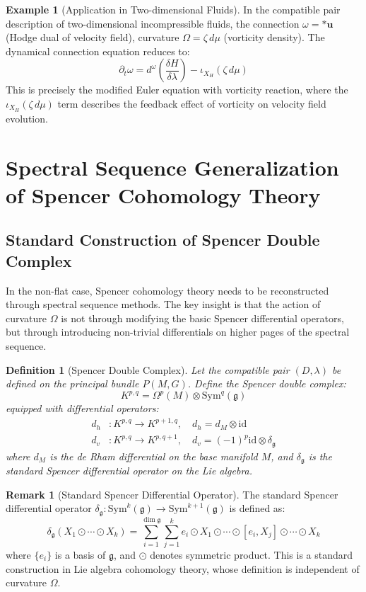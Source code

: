 \documentclass[a4paper,12pt]{extarticle}
\newtheorem{definition}{Definition}
\theoremstyle{definition}
\newtheorem{example}{Example}
\newtheorem{remark}{Remark}
\begin{document}
\begin{example}[Application in Two-dimensional Fluids]
In the compatible pair description of two-dimensional incompressible fluids\cite{zheng2025dynamical}, the connection $\omega = *\mathbf{u}$ (Hodge dual of velocity field), curvature $\Omega = \zeta \, d\mu$ (vorticity density). The dynamical connection equation reduces to:
$$\partial_t \omega = d^\omega\left(\frac{\delta H}{\delta \lambda}\right) - \iota_{X_H} (\zeta \, d\mu)$$
This is precisely the modified Euler equation with vorticity reaction, where the $\iota_{X_H} (\zeta \, d\mu)$ term describes the feedback effect of vorticity on velocity field evolution.
\end{example}

\section{Spectral Sequence Generalization of Spencer Cohomology Theory}

\subsection{Standard Construction of Spencer Double Complex}

In the non-flat case, Spencer cohomology theory needs to be reconstructed through spectral sequence methods. The key insight is that the action of curvature $\Omega$ is not through modifying the basic Spencer differential operators, but through introducing non-trivial differentials on higher pages of the spectral sequence.

\begin{definition}[Spencer Double Complex]
Let the compatible pair $(D, \lambda)$ be defined on the principal bundle $P(M, G)$. Define the Spencer double complex:
$$K^{p,q} = \Omega^p(M) \otimes \text{Sym}^q(\mathfrak{g})$$
equipped with differential operators:
\begin{align}
d_h &: K^{p,q} \to K^{p+1,q}, \quad d_h = d_M \otimes \text{id}\\
d_v &: K^{p,q} \to K^{p,q+1}, \quad d_v = (-1)^p \text{id} \otimes \delta_\mathfrak{g}
\end{align}
where $d_M$ is the de Rham differential on the base manifold $M$, and $\delta_\mathfrak{g}$ is the standard Spencer differential operator on the Lie algebra.
\end{definition}

\begin{remark}[Standard Spencer Differential Operator]
The standard Spencer differential operator $\delta_\mathfrak{g}: \text{Sym}^k(\mathfrak{g}) \to \text{Sym}^{k+1}(\mathfrak{g})$ is defined as:
$$\delta_\mathfrak{g}(X_1 \odot \cdots \odot X_k) = \sum_{i=1}^{\dim \mathfrak{g}} \sum_{j=1}^k e_i \odot X_1 \odot \cdots \odot [e_i, X_j] \odot \cdots \odot X_k$$
where $\{e_i\}$ is a basis of $\mathfrak{g}$, and $\odot$ denotes symmetric product. This is a standard construction in Lie algebra cohomology theory, whose definition is independent of curvature $\Omega$.
\end{remark}
\end{document}

